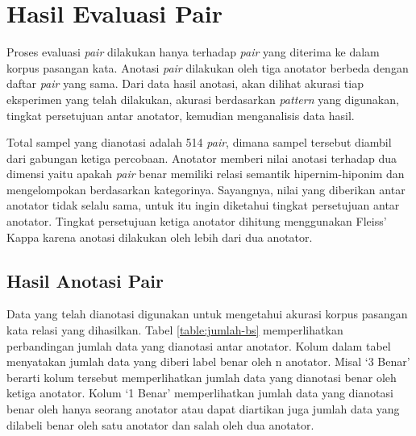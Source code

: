 \section{Hasil Evaluasi Pair}
Proses evaluasi \textit{pair} dilakukan hanya terhadap \textit{pair} yang diterima ke dalam korpus pasangan kata. Anotasi \textit{pair} dilakukan oleh tiga anotator berbeda dengan daftar \textit{pair} yang sama. Dari data hasil anotasi, akan dilihat akurasi tiap eksperimen yang telah dilakukan, akurasi berdasarkan \textit{pattern} yang digunakan, tingkat persetujuan antar anotator, kemudian menganalisis data hasil.

Total sampel yang dianotasi adalah 514 \textit{pair}, dimana sampel tersebut diambil dari gabungan ketiga percobaan. Anotator memberi nilai anotasi terhadap dua dimensi yaitu apakah \textit{pair} benar memiliki relasi semantik hipernim-hiponim dan mengelompokan berdasarkan kategorinya. Sayangnya, nilai yang diberikan antar anotator tidak selalu sama, untuk itu ingin diketahui tingkat persetujuan antar anotator. Tingkat persetujuan ketiga anotator dihitung menggunakan Fleiss' Kappa karena anotasi dilakukan oleh lebih dari dua anotator.

\subsection{Hasil Anotasi Pair}
Data yang telah dianotasi digunakan untuk mengetahui akurasi korpus pasangan kata relasi yang dihasilkan. Tabel \ref{table:jumlah-bs} memperlihatkan perbandingan jumlah data yang dianotasi antar anotator. Kolum dalam tabel menyatakan jumlah data yang diberi label benar oleh n anotator. Misal `3 Benar' berarti kolum tersebut memperlihatkan jumlah data yang dianotasi benar oleh ketiga anotator. Kolum `1 Benar' memperlihatkan jumlah data yang dianotasi benar oleh hanya seorang anotator atau dapat diartikan juga jumlah data yang dilabeli benar oleh satu anotator dan salah oleh dua anotator.

